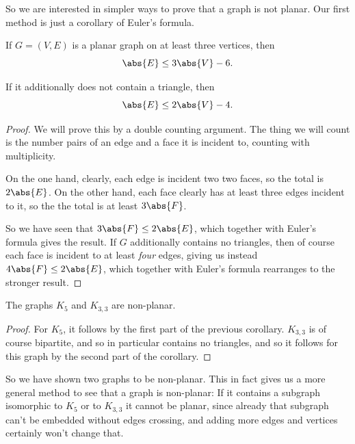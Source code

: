 \documentclass[nobib]{tufte-handout}
\begin{document}
So we are interested in simpler ways to prove that a graph is not planar. Our first method is just a corollary of Euler's formula.

\begin{corollary}
  If $G = (V,E)$ is a planar graph on at least three vertices, then
  $$\abs{E} \leq 3\abs{V} - 6.$$

  If it additionally does not contain a triangle, then
  $$\abs{E} \leq 2\abs{V} - 4.$$

  \begin{proof}
    We will prove this by a double counting argument. The thing we will count is the number pairs of an edge and a face it is incident to, counting with multiplicity.

    On the one hand, clearly, each edge is incident two two faces, so the total is $2\abs{E}$. On the other hand, each face clearly has at least three edges incident to it, so the the total is at least $3\abs{F}$.

    So we have seen that $3\abs{F} \leq 2\abs{E}$, which together with Euler's formula gives the result. If $G$ additionally contains no triangles, then of course each face is incident to at least \emph{four} edges, giving us instead $4\abs{F} \leq 2\abs{E}$, which together with Euler's formula rearranges to the stronger result.
  \end{proof}
\end{corollary}

\begin{corollary}
  The graphs $K_5$ and $K_{3,3}$ are non-planar.

  \begin{proof}
    For $K_5$, it follows by the first part of the previous corollary. $K_{3,3}$ is of course bipartite, and so in particular contains no triangles, and so it follows for this graph by the second part of the corollary.
  \end{proof}
\end{corollary}

So we have shown two graphs to be non-planar. This in fact gives us a more general method to see that a graph is non-planar: If it contains a subgraph isomorphic to $K_5$ or to $K_{3,3}$ it cannot be planar, since already that subgraph can't be embedded without edges crossing, and adding more edges and vertices certainly won't change that.
\end{document}
